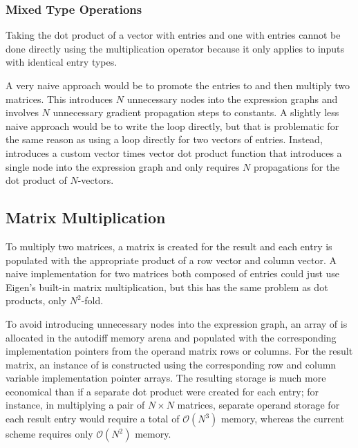 \documentclass[10pt]{article}
\begin{document}
\subsubsection{Mixed Type Operations}

Taking the dot product of a vector with  entries and one
with  entries cannot be done directly using the 
multiplication operator because it only applies to inputs with
identical entry types.  

A very naive approach would be to promote the  entries to
 and then multiply two  matrices.  This introduces
$N$ unnecessary nodes into the expression graphs and involves $N$
unnecessary gradient propagation steps to constants.  A slightly less
naive approach would be to write the loop directly, but that
is problematic for the same reason as using a loop directly for two
vectors of  entries.  Instead,  introduces
a custom  vector times  vector dot product
function that introduces a single node into the expression graph and
only requires $N$ propagations for the dot product of $N$-vectors.


\subsection{Matrix Multiplication}

To multiply two matrices, a matrix is created for the result and each
entry is populated with the appropriate product of a row vector and
column vector.  A naive implementation for two matrices both composed
of  entries could just use Eigen's built-in matrix
multiplication, but this has the same problem as dot products, only
$N^2$-fold.

To avoid introducing unnecessary nodes into the expression graph, an
array of  is allocated in the autodiff memory arena and
populated with the corresponding implementation pointers from the
operand matrix rows or columns.  For the result matrix, an instance of
 is constructed using the corresponding row
and column variable implementation pointer arrays.  The resulting
storage is much more economical than if a separate dot product were
created for each entry; for instance, in multiplying a pair of $N
\times N$ matrices, separate operand storage for each result entry
would require a total of $\mathcal{O}(N^3)$ memory, whereas the
current scheme requires only $\mathcal{O}(N^2)$ memory.
\end{document}
